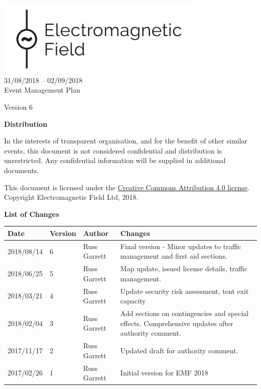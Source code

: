 

\newcommand{\st}{\textsuperscript{st} }
\newcommand{\nd}{\textsuperscript{nd} }
\renewcommand{\th}{\textsuperscript{th} }
\newcommand{\rd}{\textsuperscript{rd} }
\newcommand{\sq}{\textsuperscript{2}}




\begin{titlepage}
\thispagestyle{empty}
\begin{center}
    \includegraphics[width=10cm]{../resources/emf-logo.png}\\[24pt]
    {\LARGE 31/08/2018 -- 02/09/2018} \\[48pt]

    {\Large Event Management Plan}

    Version 6

    \vfill

    \begin{framed}
        \textbf{Distribution}

        In the interests of transparent organisation, and for the benefit of other similar events,
        this document is not considered confidential and distribution is unrestricted.
        Any confidential information will be supplied in additional documents.
        
        \footnotesize{This document is licensed under the
        \href{https://creativecommons.org/licenses/by/4.0/}{Creative Commons Attribution 4.0 license}.
        Copyright Electromagnetic Field Ltd, 2018.}
    \end{framed}

    \textbf{List of Changes}
    \begin{tabular}{l | l | l | p{10cm}}
      Date & Version & Author & Changes \\
      \hline
      2018/08/14 & 6 & Russ Garrett & Final version - Minor updates to traffic management and first aid sections. \\
      2018/06/25 & 5 & Russ Garrett & Map update, issued license details, traffic management. \\
      2018/03/21 & 4 & Russ Garrett & Update security risk assessment, tent exit capacity \\
      2018/02/04 & 3 & Russ Garrett & Add sections on contingencies and special effects.
                                      Comprehensive updates after authority comment. \\
      2017/11/17 & 2 & Russ Garrett & Updated draft for authority comment. \\
      2017/02/26 & 1 & Russ Garrett & Initial version for EMF 2018 \\
    \end{tabular}
\end{center}
\end{titlepage}
\setcounter{page}{2}

\tableofcontents

\newpage



